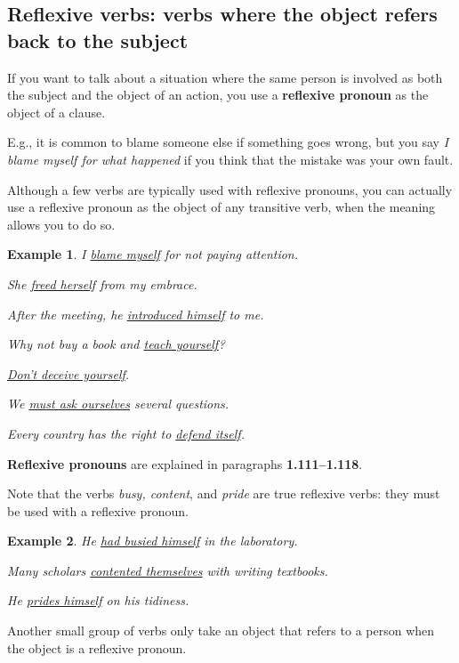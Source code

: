 \documentclass[oneside]{book}
\numberwithin{equation}{section}
\newtheorem{example}{Example}[section]
\begin{document}
\subsection{Reflexive verbs: verbs where the object refers back to the subject}
\noindent{} If you want to talk about a situation where the same person is involved as both the subject and the object of an action, you use a \textbf{reflexive pronoun} as the object of a clause.

E.g., it is common to blame someone else if something goes wrong, but you say \textit{I blame myself for what happened} if you think that the mistake was your own fault.

%
Although a few verbs are typically used with reflexive pronouns, you can actually use a reflexive pronoun as the object of any transitive verb, when the meaning allows you to do so.
\begin{example}
    I \underline{blame myself} for not paying attention.
    
    She \underline{freed herself} from my embrace.
    
    After the meeting, he \underline{introduced himself} to me.
    
    Why not buy a book and \underline{teach yourself}?
    
    \underline{Don't deceive yourself}.
    
    We \underline{must ask ourselves} several questions.
    
    Every country has the right to \underline{defend itself}.
\end{example}
\textbf{Reflexive pronouns} are explained in paragraphs \textbf{1.111--1.118}.

%
\noindent{} Note that the verbs \textit{busy, content}, and \textit{pride} are true reflexive verbs: they must be used with a reflexive pronoun.
\begin{example}
    He \underline{had busied himself} in the laboratory.
    
    Many scholars \underline{contented themselves} with writing textbooks.
    
    He \underline{prides himself} on his tidiness.
\end{example}
%
\noindent{} Another small group of verbs only take an object that refers to a person when the object is a reflexive pronoun.
\end{document}
